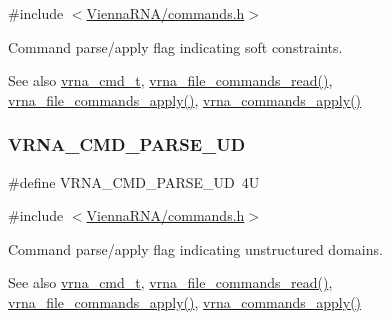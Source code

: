 {\ttfamily \#include $<$\hyperlink{commands_8h}{Vienna\+R\+N\+A/commands.\+h}$>$}



Command parse/apply flag indicating soft constraints. 

\begin{DoxySeeAlso}{See also}
\hyperlink{group__command__files_gaf31afe4c5f8e4bf44a670ab4c3dcd916}{vrna\+\_\+cmd\+\_\+t}, \hyperlink{group__command__files_gae5f56400ed43683338f7bf1c1102655a}{vrna\+\_\+file\+\_\+commands\+\_\+read()}, \hyperlink{group__command__files_gadbe8c9622f7bcc6dcbe3448b98df8656}{vrna\+\_\+file\+\_\+commands\+\_\+apply()}, \hyperlink{group__command__files_gac65d0fe86f7671a2d2b85dda1a3ddc16}{vrna\+\_\+commands\+\_\+apply()} 
\end{DoxySeeAlso}
\mbox{\label{group__command__files_ga6c6409780698826b04ebfed9151d7649}} 
\subsubsection{\texorpdfstring{V\+R\+N\+A\+\_\+\+C\+M\+D\+\_\+\+P\+A\+R\+S\+E\+\_\+\+UD}{VRNA\_CMD\_PARSE\_UD}}
{\footnotesize\ttfamily \#define V\+R\+N\+A\+\_\+\+C\+M\+D\+\_\+\+P\+A\+R\+S\+E\+\_\+\+UD~4U}



{\ttfamily \#include $<$\hyperlink{commands_8h}{Vienna\+R\+N\+A/commands.\+h}$>$}



Command parse/apply flag indicating unstructured domains. 

\begin{DoxySeeAlso}{See also}
\hyperlink{group__command__files_gaf31afe4c5f8e4bf44a670ab4c3dcd916}{vrna\+\_\+cmd\+\_\+t}, \hyperlink{group__command__files_gae5f56400ed43683338f7bf1c1102655a}{vrna\+\_\+file\+\_\+commands\+\_\+read()}, \hyperlink{group__command__files_gadbe8c9622f7bcc6dcbe3448b98df8656}{vrna\+\_\+file\+\_\+commands\+\_\+apply()}, \hyperlink{group__command__files_gac65d0fe86f7671a2d2b85dda1a3ddc16}{vrna\+\_\+commands\+\_\+apply()} 
\end{DoxySeeAlso}
\mbox{\label{group__command__files_gaf5e20210173cdb83bf70256a454f284b}} 
